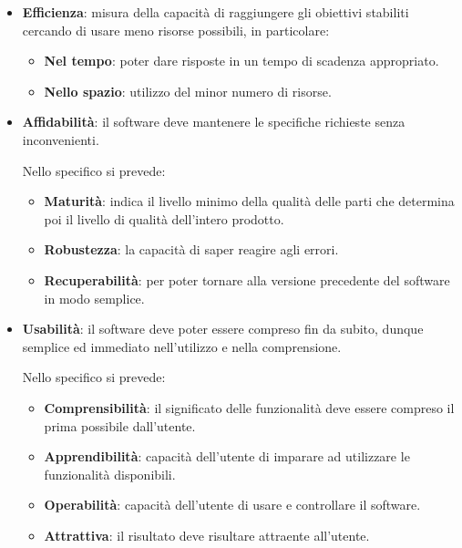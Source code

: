 \begin{itemize}
			\item \textbf{Efficienza}: misura della capacità di raggiungere gli obiettivi stabiliti cercando di usare meno risorse possibili, in particolare:

			\begin{itemize}
				\item \textbf{Nel tempo}: poter dare risposte in un tempo di scadenza appropriato.
				\item \textbf{Nello spazio}: utilizzo del minor numero di risorse.
			\end{itemize}

			\item \textbf{Affidabilità}: il software deve mantenere le specifiche richieste senza inconvenienti.

			Nello specifico si prevede:

			\begin{itemize}
				\item \textbf{Maturità}: indica il livello minimo della qualità delle parti che determina poi il livello di qualità dell'intero prodotto.
				\item \textbf{Robustezza}: la capacità di saper reagire agli errori.
				\item \textbf{Recuperabilità}: per poter tornare alla versione precedente del software in modo semplice.
			\end{itemize}

			\item \textbf{Usabilità}: il software deve poter essere compreso fin da subito, dunque semplice ed immediato nell'utilizzo e nella comprensione.

			Nello specifico si prevede:

			\begin{itemize}
				\item \textbf{Comprensibilità}: il significato delle funzionalità deve essere compreso il prima possibile dall'utente.
				\item \textbf{Apprendibilità}: capacità dell'utente di imparare ad utilizzare le funzionalità disponibili.
				\item \textbf{Operabilità}: capacità dell'utente di usare e controllare il software.
				\item \textbf{Attrattiva}: il risultato deve risultare attraente all'utente.
			\end{itemize}
		\end{itemize}

